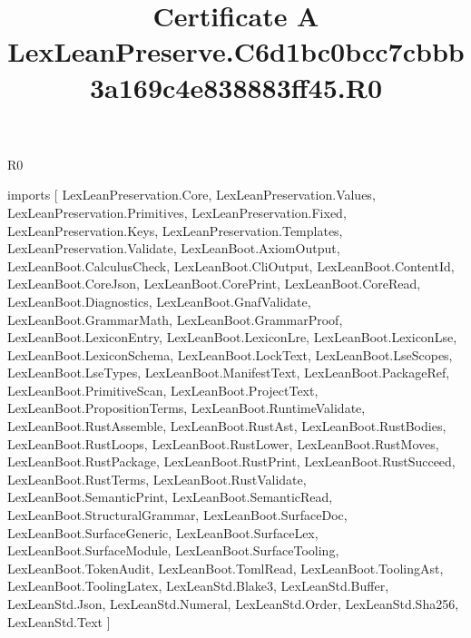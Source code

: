 \begin{lexlean}{R0}
\title{Certificate A LexLeanPreserve.C6d1bc0bcc7cbbb3a169c4e838883ff45.R0}
\begin{coremodule}
imports [
  LexLeanPreservation.Core,
  LexLeanPreservation.Values,
  LexLeanPreservation.Primitives,
  LexLeanPreservation.Fixed,
  LexLeanPreservation.Keys,
  LexLeanPreservation.Templates,
  LexLeanPreservation.Validate,
  LexLeanBoot.AxiomOutput,
  LexLeanBoot.CalculusCheck,
  LexLeanBoot.CliOutput,
  LexLeanBoot.ContentId,
  LexLeanBoot.CoreJson,
  LexLeanBoot.CorePrint,
  LexLeanBoot.CoreRead,
  LexLeanBoot.Diagnostics,
  LexLeanBoot.GnafValidate,
  LexLeanBoot.GrammarMath,
  LexLeanBoot.GrammarProof,
  LexLeanBoot.LexiconEntry,
  LexLeanBoot.LexiconLre,
  LexLeanBoot.LexiconLse,
  LexLeanBoot.LexiconSchema,
  LexLeanBoot.LockText,
  LexLeanBoot.LseScopes,
  LexLeanBoot.LseTypes,
  LexLeanBoot.ManifestText,
  LexLeanBoot.PackageRef,
  LexLeanBoot.PrimitiveScan,
  LexLeanBoot.ProjectText,
  LexLeanBoot.PropositionTerms,
  LexLeanBoot.RuntimeValidate,
  LexLeanBoot.RustAssemble,
  LexLeanBoot.RustAst,
  LexLeanBoot.RustBodies,
  LexLeanBoot.RustLoops,
  LexLeanBoot.RustLower,
  LexLeanBoot.RustMoves,
  LexLeanBoot.RustPackage,
  LexLeanBoot.RustPrint,
  LexLeanBoot.RustSucceed,
  LexLeanBoot.RustTerms,
  LexLeanBoot.RustValidate,
  LexLeanBoot.SemanticPrint,
  LexLeanBoot.SemanticRead,
  LexLeanBoot.StructuralGrammar,
  LexLeanBoot.SurfaceDoc,
  LexLeanBoot.SurfaceGeneric,
  LexLeanBoot.SurfaceLex,
  LexLeanBoot.SurfaceModule,
  LexLeanBoot.SurfaceTooling,
  LexLeanBoot.TokenAudit,
  LexLeanBoot.TomlRead,
  LexLeanBoot.ToolingAst,
  LexLeanBoot.ToolingLatex,
  LexLeanStd.Blake3,
  LexLeanStd.Buffer,
  LexLeanStd.Json,
  LexLeanStd.Numeral,
  LexLeanStd.Order,
  LexLeanStd.Sha256,
  LexLeanStd.Text
]


\end{coremodule}
\end{lexlean}
